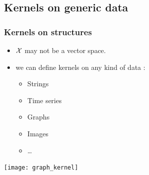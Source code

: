 \documentclass[11pt, pdf, compress, handout]{beamer}
\begin{document}

 \subsection{Kernels on generic data}
\begin{frame}
  \frametitle{Kernels on structures}
      \begin{itemize}
      \item ${\mathcal{X}}$ may not be a vector space.
      \item we can define kernels on any kind of data :
        
        \begin{itemize}
        \item Strings
        \item Time series
        \item Graphs
        \item Images
        \item \dots
        \end{itemize}
        \end{itemize}

        \begin{center}
          \texttt{[image: graph\_kernel]}
        \end{center}

  \end{frame}
\end{document}
